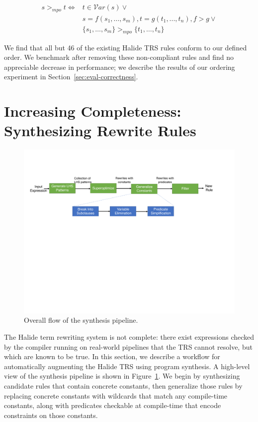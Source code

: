 \documentclass[sigplan,10pt,review,anonymous]{acmart}\settopmatter{printfolios=true,printccs=false,printacmref=false}
\newcommand{\NumOrderingProblems}{{\color{black} 46}\xspace}
\begin{document}
\begin{equation*}
\begin{split}
s >_{mpo} t \iff & t \in \mathcal{V}ar(s) \vee \\
              &  s = f(s_1,\dots,s_m), t = g(t_1,...,t_n), f > g \vee \\
               & \{s_1, \dots, s_m\} >_{mpo} \{t_1,\dots,t_n\}
\end{split}
\end{equation*}

We find that all but \NumOrderingProblems of the existing Halide TRS rules conform to our defined order. We benchmark after removing these non-compliant rules and find no appreciable decrease in performance; we describe the results of our ordering experiment in Section~\ref{sec:eval-correctness}.




\section{Increasing Completeness: Synthesizing Rewrite Rules}
\begin{figure}
\includegraphics[width=1.9\columnwidth]{figures/synthesis-flow.pdf}
\caption{Overall flow of the synthesis pipeline.}
\label{fig:synthesis-flow}
\end{figure}


The Halide term rewriting system is not complete: there
exist expressions checked by the compiler running on real-world pipelines that
the TRS cannot resolve, but which are known to be true. 
In this section, we describe a workflow for automatically augmenting the Halide
TRS using program synthesis.
A high-level view of the synthesis pipeline is shown in Figure~\ref{fig:synthesis-flow}.
We begin by synthesizing candidate rules that contain concrete constants,
then generalize those rules by replacing concrete constants with wildcards that
match any compile-time constants, along with predicates checkable at compile-time
that encode constraints on those constants.
\end{document}
